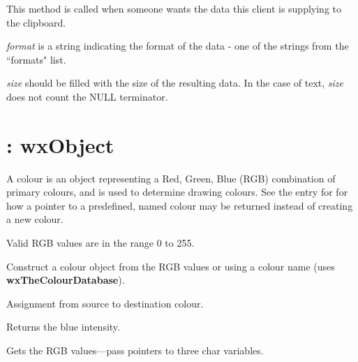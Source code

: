 
This method is called when someone wants the data this client is
supplying to the clipboard.

{\it format} is a string indicating the
format of the data - one of the strings from the ``formats"
list.

{\it size} should be filled with the size of the resulting
data. In the case of text, {\it size} does not count the
NULL terminator.

\section{: wxObject}\label{wxcolour}

A colour is an object representing a Red, Green, Blue (RGB) combination
of primary colours, and is used to determine drawing colours. See the
entry for  for how a pointer to a predefined,
named colour may be returned instead of creating a new colour.

Valid RGB values are in the range 0 to 255.




Construct a colour object from the RGB values or using a colour name
(uses {\bf wxTheColourDatabase}).

\label{wxcolourequal}


Assignment from source to destination colour.



Returns the blue intensity.



Gets the RGB values---pass pointers to three char variables.



